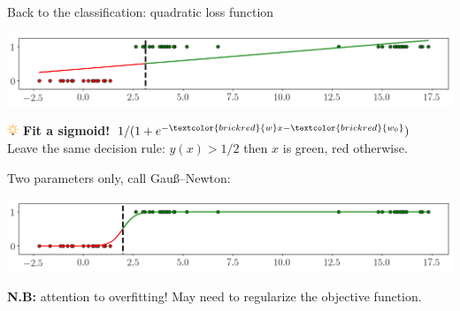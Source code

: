 \documentclass[UKenglish,aspectratio=169]{beamer}
\newcommand\unknown[1]{\textcolor{brickred}{#1}}
\begin{document}
\begin{frame}{Back to the classification: quadratic loss function}
\centerline{\includegraphics[width=.9\linewidth]{../manuscript/img/linear-1d-b.png}}

\pause
\vspace{1ex}
\includegraphics[width=10pt]{../manuscript/img/idea.png} \textbf{Fit a sigmoid!} $1/(1+e^{-\unknown{w}x - \unknown{w_0}})$\\
Leave the same decision rule: $y(x)>1/2$ then $x$ is green, red otherwise.

\pause
\vspace{1ex}
Two parameters only, call Gauß–Newton:
\centerline{\includegraphics[width=.9\linewidth]{../manuscript/img/logistic-1d-b.png}}

\textbf{N.B:} attention to overfitting! May need to regularize the objective function.
\end{frame}
\end{document}
